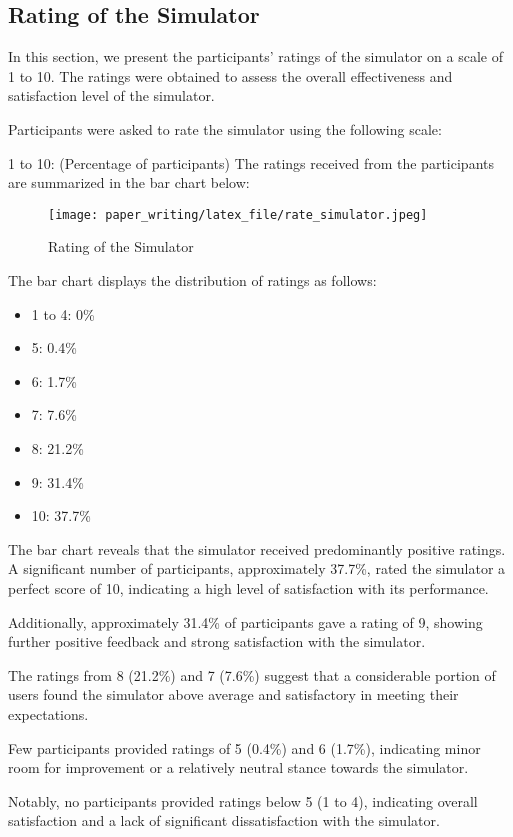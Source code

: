 \documentclass[conference]{paper_writing/latex_file/IEEEtran}
\begin{document}
\subsection{Rating of the Simulator}
In this section, we present the participants' ratings of the simulator on a scale of 1 to 10. The ratings were obtained to assess the overall effectiveness and satisfaction level of the simulator.

Participants were asked to rate the simulator using the following scale:

1 to 10: (Percentage of participants)
The ratings received from the participants are summarized in the bar chart below:
\begin{figure}[h]
    \centering
    \texttt{[image: paper\_writing/latex\_file/rate\_simulator.jpeg]}
    \caption{Rating of the Simulator}
    \label{fig:enter-label}
\end{figure}
The bar chart displays the distribution of ratings as follows:
\begin{itemize}
    \item 1 to 4: 0\%
    \item 5: 0.4\%
    \item 6: 1.7\%
    \item 7: 7.6\%
    \item 8: 21.2\%
    \item 9: 31.4\%
    \item 10: 37.7\%
\end{itemize}
The bar chart reveals that the simulator received predominantly positive ratings. A significant number of participants, approximately 37.7\%, rated the simulator a perfect score of 10, indicating a high level of satisfaction with its performance.

Additionally, approximately 31.4\% of participants gave a rating of 9, showing further positive feedback and strong satisfaction with the simulator.

The ratings from 8 (21.2\%) and 7 (7.6\%) suggest that a considerable portion of users found the simulator above average and satisfactory in meeting their expectations.

Few participants provided ratings of 5 (0.4\%) and 6 (1.7\%), indicating minor room for improvement or a relatively neutral stance towards the simulator.

Notably, no participants provided ratings below 5 (1 to 4), indicating overall satisfaction and a lack of significant dissatisfaction with the simulator.
\end{document}
